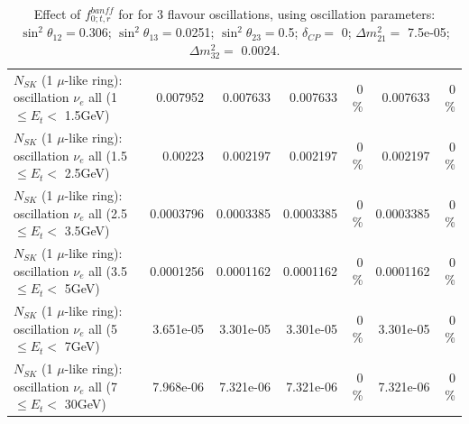 \begin{table}
\begin{tabular}{| l | r | r | r  r | r  r |}
$N_{SK}$ (1 $\mu$-like ring): oscillation $\nu_{e}$ all (1 $\leq E_{t} <$ 1.5GeV) &        0.007952 &        0.007633 &        0.007633 &        0 \%  &        0.007633 &        0 \%  \\ 
$N_{SK}$ (1 $\mu$-like ring): oscillation $\nu_{e}$ all (1.5 $\leq E_{t} <$ 2.5GeV) &         0.00223 &        0.002197 &        0.002197 &        0 \%  &        0.002197 &        0 \%  \\ 
$N_{SK}$ (1 $\mu$-like ring): oscillation $\nu_{e}$ all (2.5 $\leq E_{t} <$ 3.5GeV) &       0.0003796 &       0.0003385 &       0.0003385 &        0 \%  &       0.0003385 &        0 \%  \\ 
$N_{SK}$ (1 $\mu$-like ring): oscillation $\nu_{e}$ all (3.5 $\leq E_{t} <$ 5GeV) &       0.0001256 &       0.0001162 &       0.0001162 &        0 \%  &       0.0001162 &        0 \%  \\ 
 $N_{SK}$ (1 $\mu$-like ring): oscillation $\nu_{e}$ all (5 $\leq E_{t} <$ 7GeV) &       3.651e-05 &       3.301e-05 &       3.301e-05 &        0 \%  &       3.301e-05 &        0 \%  \\ 
$N_{SK}$ (1 $\mu$-like ring): oscillation $\nu_{e}$ all (7 $\leq E_{t} <$ 30GeV) &       7.968e-06 &       7.321e-06 &       7.321e-06 &        0 \%  &       7.321e-06 &        0 \%  \\ 
\hline
\hline
\end{tabular}
\caption{ Effect of $f_{0; t, r}^{banff}$ for for 3 flavour oscillations, using oscillation parameters:  $\sin^2\theta_{12} = $0.306; $\sin^2\theta_{13} = $0.0251; $\sin^2\theta_{23} = $0.5; $\delta_{CP} = $        0; $\Delta m^2_{21} = $    7.5e-05; $\Delta m^2_{32} = $    0.0024. }
\label{tab:num_banff_00_1RmuT_3f_osc_t13:0.0251}
\end{table}
\clearpage
